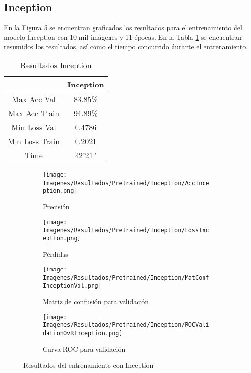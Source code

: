 \documentclass{report}
\begin{document}
\newpage
\subsection{Inception}


En la Figura \ref{fig:RInception} se encuentran graficados los resultados para el entrenamiento del modelo Inception con 10 mil imágenes y 11 épocas. En la Tabla \ref{tab:RInception} se encuentran resumidos los resultados, así como el tiempo concurrido durante el entrenamiento.


\begin{table}[H]
\centering
\begin{tabular}{|c|c|}
\hline
\cellcolor[HTML]{FFFFFF}{\color[HTML]{000000} Modelo} & Inception \\ \hline
Max Acc Val                                           & 83.85\%        \\ \hline
Max Acc Train                                         & 94.89\%        \\ \hline
Min Loss Val                                          & 0.4786       \\ \hline
Min Loss Train                                        & 0.2021        \\ \hline
Time                                                  & 42'21''        \\ \hline
\end{tabular}
\caption{Resultados Inception}
\label{tab:RInception}
\end{table}


\vspace{0.4cm}
\begin{figure}[H]
	 	\centering
	 	\begin{subfigure}[b]{0.45\linewidth}
	 	\centering
	 		\texttt{[image: Imagenes/Resultados/Pretrained/Inception/AccInception.png]}
	 		\caption{ Precisión }
                    \label{fig:InceptionPrecision}
	 	\end{subfigure}
	 	\begin{subfigure}[b]{0.45\linewidth}
	 	\centering
	 		\texttt{[image: Imagenes/Resultados/Pretrained/Inception/LossInception.png]}
                    \caption{ Pérdidas }
                    \label{fig:InceptionLoss}
	 	\end{subfigure}
	 	\centering
	 	\begin{subfigure}[b]{0.45\linewidth}
	 	\centering
	 		\texttt{[image: Imagenes/Resultados/Pretrained/Inception/MatConfInceptionVal.png]}
	 		\caption{ Matriz de confusión para validación }
                    \label{fig:InceptionConf}
	 	\end{subfigure}
	 	\centering
	 	\begin{subfigure}[b]{0.45\linewidth}
	 	\centering
	 		\texttt{[image: Imagenes/Resultados/Pretrained/Inception/ROCValidationOvRInception.png]}
	 		\caption{ Curva ROC para validación }
                    \label{fig:InceptionCurvaROC}
	 	\end{subfigure}
	 	\caption{ Resultados del entrenamiento con Inception}
	 	\label{fig:RInception}
\end{figure}
\end{document}
